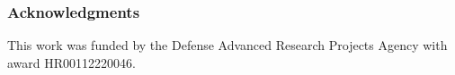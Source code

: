 \subsubsection*{Acknowledgments}
This work was funded by the Defense Advanced Research Projects Agency with award HR00112220046.


